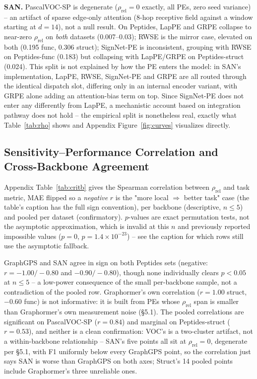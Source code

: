 \documentclass[10pt]{article}
\begin{document}
\textbf{SAN.} PascalVOC-SP is degenerate ($\rho_{\text{rel}}{=}0$ exactly, all PEs, zero seed variance) -- an artifact of sparse edge-only attention (8-hop receptive field against a window starting at $d{=}14$), not a null result. On Peptides, LapPE and GRPE collapse to near-zero $\rho_{\text{rel}}$ on \emph{both} datasets (0.007--0.03); RWSE is the mirror case, elevated on both (0.195 func, 0.306 struct); SignNet-PE is inconsistent, grouping with RWSE on Peptides-func (0.183) but collapsing with LapPE/GRPE on Peptides-struct (0.024). This split is not explained by how the PE enters the model: in SAN's implementation, LapPE, RWSE, SignNet-PE and GRPE are all routed through the identical dispatch slot, differing only in an internal encoder variant, with GRPE alone adding an attention-bias term on top. Since SignNet-PE does not enter any differently from LapPE, a mechanistic account based on integration pathway does not hold -- the empirical split is nonetheless real, exactly what Table~\ref{tab:rho} shows and Appendix Figure~\ref{fig:curves} visualizes directly.

\subsection{Sensitivity--Performance Correlation and Cross-Backbone Agreement}
Appendix Table~\ref{tab:critb} gives the Spearman correlation between $\rho_{\text{rel}}$ and task metric, MAE flipped so a \emph{negative} $r$ is the "more local $\Rightarrow$ better task" case (the table's caption has the full sign convention), per backbone (descriptive, $n\le5$) and pooled per dataset (confirmatory). $p$-values are exact permutation tests, not the asymptotic approximation, which is invalid at this $n$ and previously reported impossible values ($p{=}0$, $p{=}1.4\times10^{-23}$) -- see the caption for which rows still use the asymptotic fallback.

GraphGPS and SAN agree in sign on both Peptides sets (negative: $r{=}{-1.00}/{-}0.80$ and $-0.90/-0.80$), though none individually clears $p<0.05$ at $n{\le}5$ -- a low-power consequence of the small per-backbone sample, not a contradiction of the pooled row. Graphormer's own correlation ($r{=}1.00$ struct, $-0.60$ func) is not informative: it is built from PEs whose $\rho_{\text{rel}}$ span is smaller than Graphormer's own measurement noise (\S5.1). The pooled correlations are significant on PascalVOC-SP ($r{=}0.84$) and marginal on Peptides-struct ($r{=}0.53$), and neither is a clean confirmation: VOC's is a two-cluster artifact, not a within-backbone relationship -- SAN's five points all sit at $\rho_{\text{rel}}{=}0$, degenerate per \S5.1, with F1 uniformly below every GraphGPS point, so the correlation just says SAN is worse than GraphGPS on both axes; Struct's 14 pooled points include Graphormer's three unreliable ones.
\end{document}
